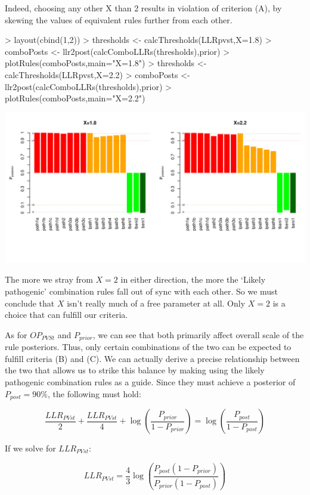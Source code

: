 \documentclass[12pt]{article}
\begin{document}
Indeed, choosing any other X than 2 results in violation of criterion (A), by
skewing the values of equivalent rules further from each other.

\begin{Schunk}
\begin{Sinput}
> layout(cbind(1,2))
> thresholds <- calcThresholds(LLRpvst,X=1.8)
> comboPosts <- llr2post(calcComboLLRs(thresholds),prior)
> plotRules(comboPosts,main="X=1.8")
> thresholds <- calcThresholds(LLRpvst,X=2.2)
> comboPosts <- llr2post(calcComboLLRs(thresholds),prior)
> plotRules(comboPosts,main="X=2.2")
\end{Sinput}
\end{Schunk}
\includegraphics{tavtigian-003}

The more we stray from $X=2$ in either direction, the more the `Likely pathogenic'
combination rules fall out of sync with each other. So we must conclude that $X$
isn't really much of a free parameter at all. Only $X=2$ is a choice that can
fulfill our criteria.

As for $OP_{PVSt}$ and $P_{prior}$, we can see that both primarily affect
overall scale of the rule posteriors. Thus, only certain
combinations of the two can be expected to fulfill criteria (B) and (C). We can
actually derive a precise relationship between the two that allows us to strike
this balance by making using the likely pathogenic combination rules as a guide.
Since they must achieve a posterior of $P_{post}=90\%$, the following must hold:

$$
\frac{LLR_{PVst}}{2}+\frac{LLR_{PVst}}{4} + \log(\frac{P_{prior}}{1-P_{prior}})
 = \log(\frac{P_{post}}{1-P_{post}})
$$

If we solve for $LLR_{PVst}$:

$$
LLR_{PVst} = \frac{4}{3} \log\left( \frac{P_{post}(1-P_{prior})}{P_{prior}(1-P_{post})} \right)
$$
\end{document}
